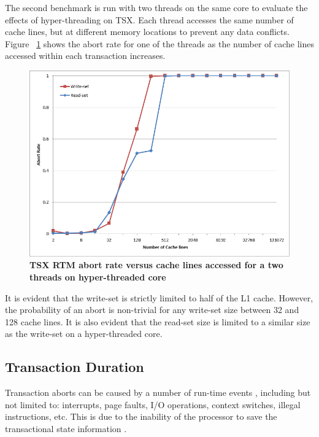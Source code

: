 \documentclass[a4paper]{article}
\begin{document}
\indent 
The second benchmark is run with two threads on the same core to
evaluate the effects of hyper-threading on TSX.  Each thread accesses the same
number of cache lines, but at different memory locations to prevent any data
conflicts. Figure ~\ref{fig:trx_size_ht} shows the abort rate for one 
of the threads as the number of cache lines accessed within each transaction
increases.
\par

\begin{figure}[H]
    \centering
    \graphicspath{ {./figures/} }
    \includegraphics[width=\textwidth,height=\textheight,keepaspectratio]{trx_size_ht}
    \caption{\textbf{TSX RTM abort rate versus cache lines accessed for a two 
    threads on hyper-threaded core}}
    \label{fig:trx_size_ht}
\end{figure}

\indent 
It is evident that the write-set is strictly limited to half of the L1
cache.  However, the probability of an abort is non-trivial for any write-set
size between 32 and 128 cache lines.  It is also evident that the read-set size
is limited to a similar size as the write-set on a hyper-threaded core.
\par

\subsection{\textbf{Transaction Duration}}

\indent 
Transaction aborts can be caused by a number of run-time events
\cite{intel_prog_ref}, including but not limited to: interrupts, page faults,
I/O operations, context switches, illegal instructions, etc.  This is due to the
inability of the processor to save the transactional state information
\cite{schwahn}.
\par
\end{document}
